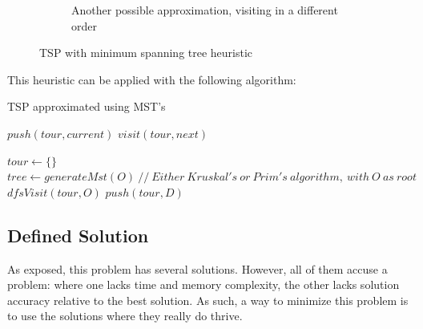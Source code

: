 \documentclass[a4paper, 12pt]{report}
\begin{document}
\begin{figure}[h]
\begin{subfigure}[b]{0.45\textwidth}
            \caption{Another possible approximation, visiting in a different order}
        \end{subfigure}

        \caption{TSP with minimum spanning tree heuristic}
        \label{fig:tspmst}
    \end{figure}
    
    \pagebreak
    
    This heuristic can be applied with the following algorithm:
    
      \begin{algorithm}
        \label{alg:mst}
    	\caption{TSP approximated using MST's} 
	    \begin{algorithmic}[1]
	    
            \State $push(tour, current)$
                \State $visit(tour, next)$
    	    \EndFor
	    \EndFunction

	    \State $tour \leftarrow \{\}$
        \State $tree \leftarrow generateMst(O) \ // \ Either\ Kruskal's\ or\ Prim's\ algorithm,\ with\ O\ as\ root$ 
        \State $dfsVisit(tour, O)$
        \State $push(tour, D)$
		
	    \end{algorithmic} 
	\end{algorithm}
    
     \subsection{Defined Solution} \label{solution}
    
    As exposed, this problem has several solutions. However, all of them accuse a problem: where one lacks time and memory complexity, the other lacks solution accuracy relative to the best solution. As such, a way to minimize this problem is to use the solutions where they really do thrive.
    
\end{document}
